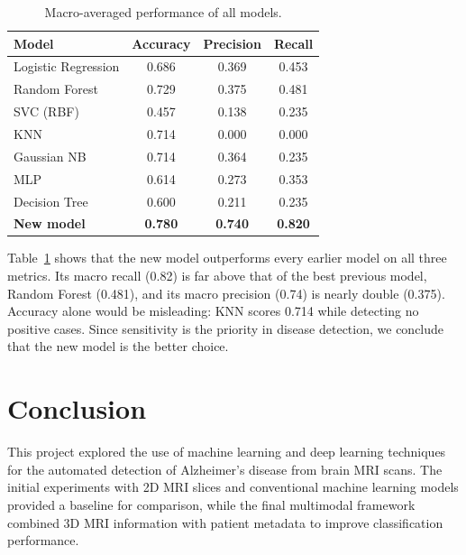 \documentclass[10pt,twocolumn]{article}
\begin{document}
        \begin{table}[H]
            \centering
            \footnotesize
            \setlength{\tabcolsep}{5pt}
            \begin{tabular}{lccc}
                \toprule
                \textbf{Model} & \textbf{Accuracy} & \textbf{Precision} & \textbf{Recall}\\
                \midrule
                Logistic Regression  & 0.686 & 0.369 & 0.453\\
                Random Forest        & 0.729 & 0.375 & 0.481\\
                SVC (RBF)            & 0.457 & 0.138 & 0.235\\
                KNN                  & 0.714 & 0.000 & 0.000\\
                Gaussian NB          & 0.714 & 0.364 & 0.235\\
                MLP                  & 0.614 & 0.273 & 0.353\\
                Decision Tree        & 0.600 & 0.211 & 0.235\\
                \midrule
                \textbf{New model}   & \textbf{0.780} & \textbf{0.740} & \textbf{0.820}\\
                \bottomrule
            \end{tabular}
            \caption{Macro-averaged performance of all models.}
            \label{tab:all_models}
        \end{table}

        \noindent
        Table~\ref{tab:all_models} shows that the new model outperforms every earlier model on all three metrics. Its macro recall (0.82) is far above that of the best previous model, Random Forest (0.481), and its macro precision (0.74) is nearly double (0.375). Accuracy alone would be misleading: KNN scores 0.714 while detecting no positive cases. Since sensitivity is the priority in disease detection, we conclude that the new model is the better choice.

\section{Conclusion}
    This project explored the use of machine learning and deep learning techniques for the automated detection of Alzheimer's disease from brain MRI scans. The initial experiments with 2D MRI slices and conventional machine learning models provided a baseline for comparison, while the final multimodal framework combined 3D MRI information with patient metadata to improve classification performance.
    
\end{document}
